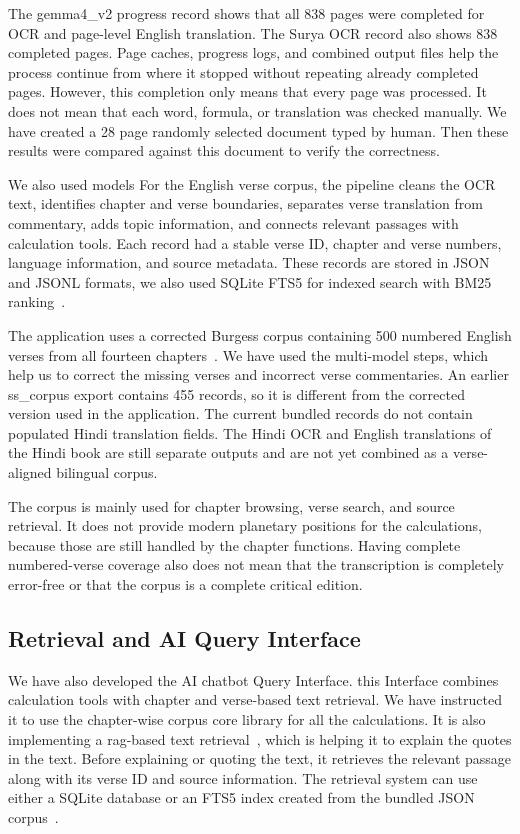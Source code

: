 \documentclass[12pt,a4paper,oneside]{report}
\begin{document}
The gemma4\_v2 progress record shows that all 838 pages were completed for OCR and page-level English translation. The Surya OCR record also shows 838 completed pages. Page caches, progress logs, and combined output files help the process continue from where it stopped without repeating already completed pages. However, this completion only means that every page was processed. It does not mean that each word, formula, or translation was checked manually. We have created a 28 page randomly selected document typed by human. Then these results were compared against this document to verify the correctness.

We also used models For the English verse corpus, the pipeline cleans the OCR text, identifies chapter and verse boundaries, separates verse translation from commentary, adds topic information, and connects relevant passages with calculation tools. Each record had a stable verse ID, chapter and verse numbers, language information, and source metadata. These records are stored in JSON and JSONL formats, we also used SQLite FTS5 for indexed search with BM25 ranking~\cite{sqlitefts5,robertson2009}.

The application uses a corrected Burgess corpus containing 500 numbered English verses from all fourteen chapters~\cite{nigam_corpusaudit}. We have used the multi-model steps, which help us to correct the missing verses and incorrect verse commentaries. An earlier ss\_corpus export contains 455 records, so it is different from the corrected version used in the application. The current bundled records do not contain populated Hindi translation fields. The Hindi OCR and English translations of the Hindi book are still separate outputs and are not yet combined as a verse-aligned bilingual corpus.

The corpus is mainly used for chapter browsing, verse search, and source retrieval. It does not provide modern planetary positions for the calculations, because those are still handled by the chapter functions. Having complete numbered-verse coverage also does not mean that the transcription is completely error-free or that the corpus is a complete critical edition.

\subsection{Retrieval and AI Query Interface}

We have also developed the AI chatbot Query Interface. this Interface combines calculation tools with chapter and verse-based text retrieval. We have instructed it to use the chapter-wise corpus core library for all the calculations. It is also implementing a rag-based text retrieval~\cite{lewis2020rag}, which is helping it to explain the quotes in the text. Before explaining or quoting the text, it retrieves the relevant passage along with its verse ID and source information. The retrieval system can use either a SQLite database or an FTS5 index created from the bundled JSON corpus~\cite{sqlitefts5}.
\end{document}
